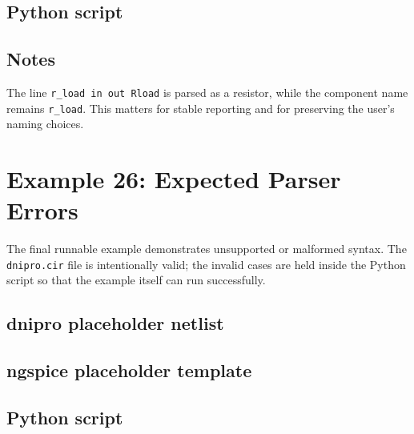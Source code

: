\documentclass[11pt,a4paper]{article}
\newcommand{\code}[1]{\texttt{#1}}
\begin{document}


\subsection{Python script}



\subsection{Notes}

The line \code{r\_load in out Rload} is parsed as a resistor, while the component
name remains \code{r\_load}. This matters for stable reporting and for preserving
the user's naming choices.

\section{Example 26: Expected Parser Errors}
\label{sec:ex-invalid-examples}

The final runnable example demonstrates unsupported or malformed syntax. The
\code{dnipro.cir} file is intentionally valid; the invalid cases are held inside
the Python script so that the example itself can run successfully.

\subsection{dnipro placeholder netlist}



\subsection{ngspice placeholder template}



\subsection{Python script}


\end{document}
